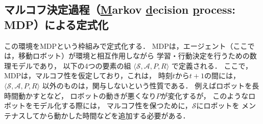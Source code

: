 \subsection{マルコフ決定過程（\underline{M}arkov \underline{d}ecision \underline{p}rocess: MDP）による定式化}

この環境をMDPという枠組みで定式化する．
MDPは，エージェント（ここでは，移動ロボット）が環境と相互作用しながら
学習・行動決定を行うための数理モデルであり，
以下の4つの要素の組 
$\langle \mathcal{S}, \mathcal{A}, P, R \rangle$
で定義される．
ここで，MDPは，マルコフ性を仮定しており，これは，
時刻$t$から$t+1$の間には，
$\langle \mathcal{S}, \mathcal{A}, P, R \rangle$
以外のものは，関与しないという性質である．
例えばロボットを長時間動かすとなど，
ロボットの動きが悪くなり$P$が変化するが，
このようなロボットをモデル化する際には，
マルコフ性を保つために，$\mathcal{S}$にロボットを
メンテナスしてから動かした時間などを追加する必要がある．

